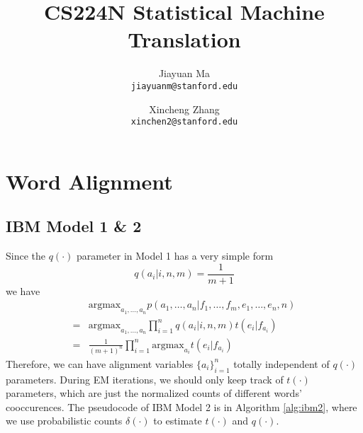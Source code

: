 \documentclass[letterpaper]{article}
\begin{document}
\title{CS224N Statistical Machine Translation}
\author{
	Jiayuan Ma \\
	\texttt{jiayuanm@stanford.edu}
	\and
	Xincheng Zhang\\
	\texttt{xinchen2@stanford.edu}
}
\maketitle

\section{Word Alignment}

\subsection{IBM Model 1 \& 2}
Since the $q(\cdot)$ parameter in Model 1 has a very simple form
\begin{equation}
q(a_i | i, n, m) = \frac{1}{m+1}
\end{equation}
we have
\begin{equation}
\begin{split}
& \textrm{argmax}_{a_1, \dots, a_n}
p(a_1, \dots, a_n | f_1, \dots, f_m, e_1, \dots, e_n, n) \\
= & \textrm{argmax}_{a_1, \dots, a_n}
\prod_{i=1}^n q(a_i | i, n, m) t(e_i | f_{a_i}) \\
= & \frac{1}{(m+1)^n} \prod_{i=1}^n \textrm{argmax}_{a_i}  t(e_i | f_{a_i})
\end{split}
\end{equation}
Therefore, we can have alignment variables $\{ a_i \}_{i=1}^n$ totally independent of $q(\cdot)$ parameters.
During EM iterations, we should only keep track of $t(\cdot)$ parameters, which are just the normalized counts of different words' cooccurences.
The pseudocode of IBM Model 2 is in Algorithm \ref{alg:ibm2}, where we use probabilistic counts $\delta(\cdot)$ to estimate $t(\cdot)$ and $q(\cdot)$.
\end{document}
